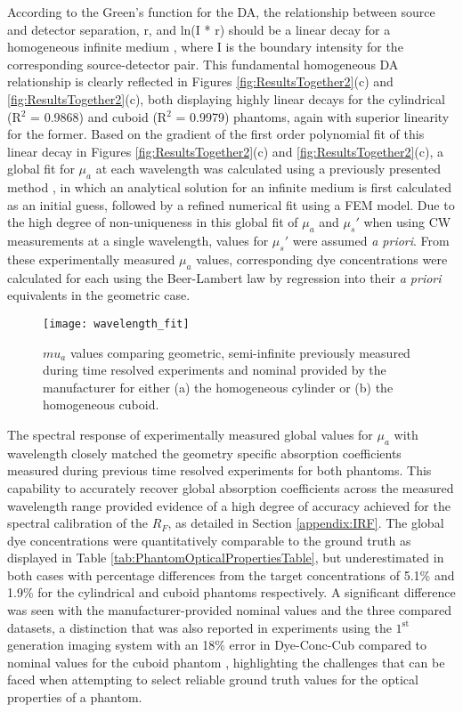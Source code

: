 \documentclass[twoside]{bhamthesis}
\theoremstyle{definition}
\begin{document}
According to the Green's function for the DA, the relationship between source and detector separation, r, and ln(I * r) should be a linear decay for a homogeneous infinite medium \cite{patterson1989quantitative}, where I is the boundary intensity for the corresponding source-detector pair. This fundamental homogeneous DA relationship is clearly reflected in Figures \ref{fig:ResultsTogether2}(c) and \ref{fig:ResultsTogether2}(c), both displaying highly linear decays for the cylindrical (R$^2$  = 0.9868) and cuboid (R$^2$ = 0.9979) phantoms, again with superior linearity for the former. Based on the gradient of the first order polynomial fit of this linear decay in Figures \ref{fig:ResultsTogether2}(c) and \ref{fig:ResultsTogether2}(c), a global fit for $\mu_a$ at each wavelength was calculated using a previously presented method \cite{mcbride2003strategies}, in which an analytical solution for an infinite medium is first calculated as an initial guess, followed by a refined numerical fit using a FEM model. Due to the high degree of non-uniqueness in this global fit of $\mu_a$ and $\mu_s'$ when using CW measurements at a single wavelength, values for $\mu_s'$ were assumed \textit{a priori}. From these experimentally measured $\mu_a$ values, corresponding dye concentrations were calculated for each using the Beer-Lambert law by regression into their \textit{a priori} equivalents in the geometric case.

\begin{figure}[!ht]
\centering
  \texttt{[image: wavelength\_fit]}
  \caption{$mu_a$ values comparing geometric, semi-infinite previously measured during time resolved experiments \cite{guggenheim2016time} and nominal provided by the manufacturer for either (a) the homogeneous cylinder or (b) the homogeneous cuboid.}
    \label{fig:wavelength_fit}
\end{figure}

The spectral response of experimentally measured global values for $\mu_a$ with wavelength closely matched the geometry specific absorption coefficients measured during previous time resolved experiments \cite{guggenheim2016time} for both phantoms. This capability to accurately recover global absorption coefficients across the measured wavelength range provided evidence of a high degree of accuracy achieved for the spectral calibration of the $R_F$, as detailed in Section \ref{appendix:IRF}. The global dye concentrations were quantitatively comparable to the ground truth as displayed in Table \ref{tab:PhantomOpticalPropertiesTable}, but underestimated in both cases with percentage differences from the target concentrations of 5.1\% and 1.9\% for the cylindrical and cuboid phantoms respectively. A significant difference was seen with the manufacturer-provided nominal values and the three compared datasets, a distinction that was also reported in experiments using the $\mathrm{1^{st}}$ generation imaging system with an 18\% error in Dye-Conc-Cub compared to nominal values for the cuboid phantom \cite{wu2016development}, highlighting the challenges that can be faced when attempting to select reliable ground truth values for the optical properties of a phantom.
\end{document}
